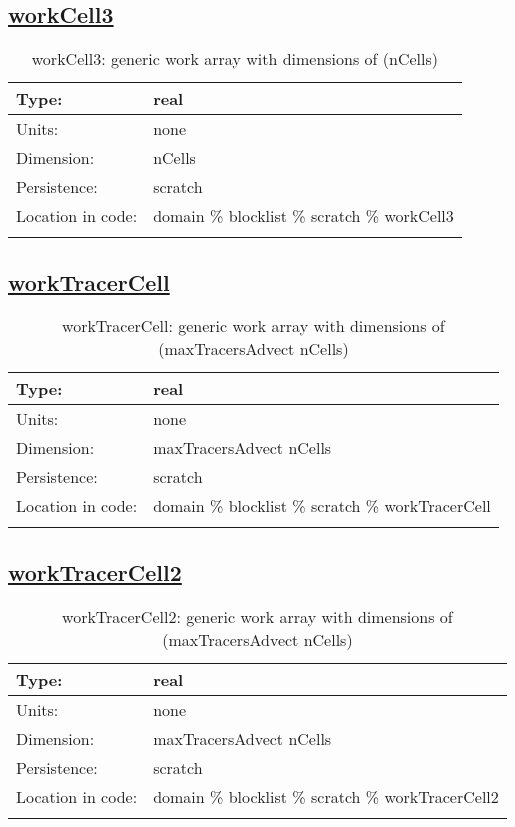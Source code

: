 \subsection[workCell3]{\hyperref[sec:var_tab_scratch]{workCell3}}
\label{subsec:var_sec_scratch_workCell3}
\begin{center}
\begin{longtable}{| p{2.0in} | p{4.0in} |}
        \hline 
        Type: & real \\
        \hline 
        Units: & \si{none} \\
        \hline 
        Dimension: & nCells \\
        \hline 
        Persistence: & scratch \\
        \hline 
         Location in code: & domain \% blocklist \% scratch \% workCell3 \\
         \hline 
    \caption{workCell3: generic work array with dimensions of (nCells)}
\end{longtable}
\end{center}
\subsection[workTracerCell]{\hyperref[sec:var_tab_scratch]{workTracerCell}}
\label{subsec:var_sec_scratch_workTracerCell}
\begin{center}
\begin{longtable}{| p{2.0in} | p{4.0in} |}
        \hline 
        Type: & real \\
        \hline 
        Units: & \si{none} \\
        \hline 
        Dimension: & maxTracersAdvect nCells \\
        \hline 
        Persistence: & scratch \\
        \hline 
         Location in code: & domain \% blocklist \% scratch \% workTracerCell \\
         \hline 
    \caption{workTracerCell: generic work array with dimensions of (maxTracersAdvect nCells)}
\end{longtable}
\end{center}
\subsection[workTracerCell2]{\hyperref[sec:var_tab_scratch]{workTracerCell2}}
\label{subsec:var_sec_scratch_workTracerCell2}
\begin{center}
\begin{longtable}{| p{2.0in} | p{4.0in} |}
        \hline 
        Type: & real \\
        \hline 
        Units: & \si{none} \\
        \hline 
        Dimension: & maxTracersAdvect nCells \\
        \hline 
        Persistence: & scratch \\
        \hline 
         Location in code: & domain \% blocklist \% scratch \% workTracerCell2 \\
         \hline 
    \caption{workTracerCell2: generic work array with dimensions of (maxTracersAdvect nCells)}
\end{longtable}
\end{center}
